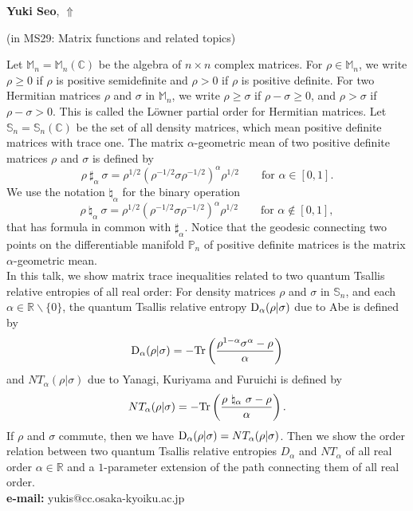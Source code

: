 \documentclass[ILAS2025-program.tex]{subfiles}
\begin{document}
\hypertarget{down0157}{}\begin{ilasabstract}
    
\textbf{Yuki Seo},  \hfill \hyperlink{up0157}{$\Uparrow$}
    
    
(in {\color{mstitle}MS29: Matrix functions and related topics})
        
\mtskip
    Let ${\mathbb M}_n = {\mathbb M}_n({\mathbb C})$ be the algebra of $n\times n$ complex matrices. For $\rho \in {\mathbb M}_n$, we write $\rho \geq 0$ if $\rho$ is positive semidefinite and $\rho >0$ if $\rho$ is positive definite. For two Hermitian matrices $\rho$ and $\sigma$ in ${\mathbb M}_n$, we write $\rho \geq \sigma$ if $\rho - \sigma \geq 0$, and $\rho > \sigma$ if $\rho - \sigma >0$. This is called the L\"{o}wner partial order for Hermitian matrices. Let ${\mathbb S}_n = {\mathbb S}_n({\mathbb C})$ be the set of all density matrices, which mean  positive definite matrices with trace one. The matrix $\alpha$-geometric mean of two positive definite matrices $\rho$ and $\sigma$ is defined by
\[
\rho\ \sharp_{\alpha}\ \sigma = \rho^{1/2}(\rho^{-1/2}\sigma \rho^{-1/2})^{\alpha}\rho^{1/2}\qquad \mbox{for $\alpha \in [0,1]$}.
\]
We use the notation $\natural_{\alpha}$ for the binary operation
\[
\rho\ \natural_{\alpha}\ \sigma = \rho^{1/2}(\rho^{-1/2}\sigma \rho^{-1/2})^{\alpha}\rho^{1/2}\qquad \mbox{for $\alpha \not\in [0,1]$},
\]
that has formula in common with $\sharp_{\alpha}$. Notice that the geodesic connecting two points on the differentiable manifold ${\mathbb P}_n$ of positive definite matrices is the matrix $\alpha$-geometric mean.\\
\quad In this talk, we show matrix trace inequalities related to two quantum Tsallis relative entropies of all real order: For density matrices $\rho$ and $\sigma$ in ${\mathbb S}_n$, and each $\alpha \in {\mathbb R}\backslash \{0\}$, the quantum Tsallis relative entropy ${\rm D}_{\alpha}(\rho|\sigma)$ due to Abe is defined by 
\[
{\rm D}_{\alpha}(\rho|\sigma)=-{\rm Tr}\left(\frac{\rho^{1-\alpha}\sigma^{\alpha}-\rho}{\alpha}\right)
\]
and $NT_{\alpha}(\rho | \sigma)$ due to Yanagi, Kuriyama and Furuichi is defined by 
\[
NT_{\alpha}(\rho|\sigma)=-{\rm Tr}\left(\frac{\rho\ \natural_{\alpha}\ \sigma-\rho}{\alpha}\right).
\]
If $\rho$ and $\sigma$ commute, then we have ${\rm D}_{\alpha}(\rho|\sigma)=NT_{\alpha}(\rho|\sigma)$. Then we show the order relation between two quantum Tsallis relative entropies $D_{\alpha}$ and $NT_{\alpha}$ of all real order $\alpha \in {\mathbb R}$ and a $1$-parameter extension of the path connecting them of all real order.\\
{\bf e-mail:} yukis@cc.osaka-kyoiku.ac.jp
\end{ilasabstract}
    
\end{document}
